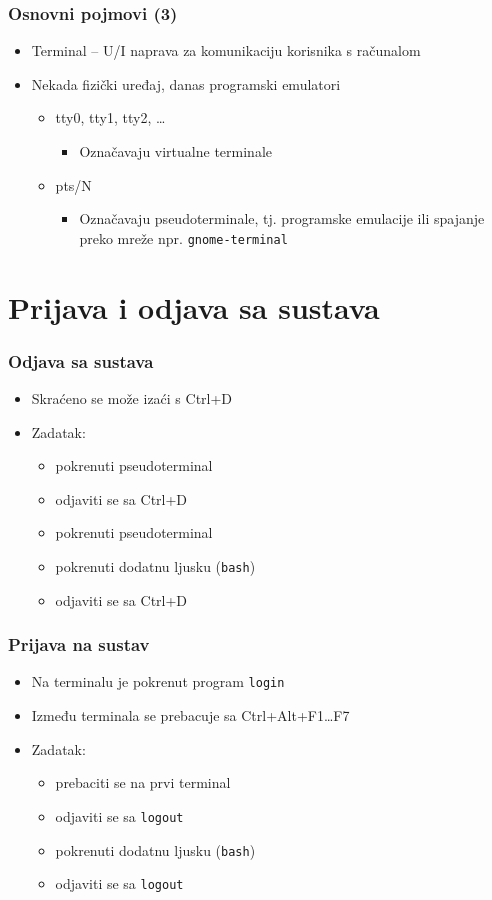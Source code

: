 \documentclass{beamer}
\newcommand{\shell}[1]{\texttt{#1}}
\begin{document}
\begin{frame}[t]
\frametitle{Osnovni pojmovi (3)}
\begin{itemize}
  \item Terminal -- U/I naprava za komunikaciju korisnika s računalom
  \item Nekada fizički uređaj, danas programski emulatori
  \begin{itemize}
    \item tty0, tty1, tty2, \ldots
    \begin{itemize}
      \item Označavaju virtualne terminale
    \end{itemize}
    \item pts/N
    \begin{itemize}
      \item Označavaju pseudoterminale, tj. programske emulacije ili 
                spajanje preko mreže npr. \shell{gnome-terminal}
    \end{itemize}
  \end{itemize}
\end{itemize}
\end{frame}

\section{Prijava i odjava sa sustava}
\begin{frame}[t]
\frametitle{Odjava sa sustava}
\begin{itemize}
  \item Skraćeno se može izaći s Ctrl+D
  \item Zadatak:
  \begin{itemize}
    \item pokrenuti pseudoterminal
    \item odjaviti se sa Ctrl+D
    \item pokrenuti pseudoterminal
    \item pokrenuti dodatnu ljusku (\shell{bash})
    \item odjaviti se sa Ctrl+D
  \end{itemize}
\end{itemize}
\end{frame}

\begin{frame}[t]
\frametitle{Prijava na sustav}
\begin{itemize}
  \item Na terminalu je pokrenut program \shell{login}
  \item Između terminala se prebacuje sa Ctrl+Alt+F1\ldots F7
  \item Zadatak:
  \begin{itemize}
    \item prebaciti se na prvi terminal
    \item odjaviti se sa \shell{logout}
    \item pokrenuti dodatnu ljusku (\shell{bash})
    \item odjaviti se sa \shell{logout}
  \end{itemize}
\end{itemize}
\end{frame}
\end{document}
